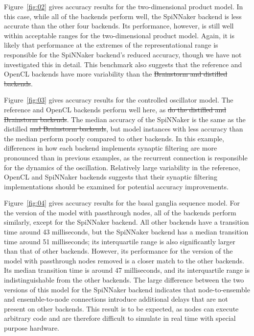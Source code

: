 \documentclass{frontiersSCNS}
\providecommand{\DIFadd}[1]{{\protect\color{blue}\uwave{#1}}} %
\providecommand{\DIFdel}[1]{{\protect\color{red}\sout{#1}}}                      %
\providecommand{\DIFaddbegin}{} %
\providecommand{\DIFaddend}{} %
\providecommand{\DIFdelbegin}{} %
\providecommand{\DIFdelend}{} %
\begin{document}
Figure~\ref{fig:02} gives accuracy results
for the two-dimensional product model.
In this case, while all of the backends
perform well, the SpiNNaker backend
is less accurate than the other four backends.
Its performance, however, is still well within
acceptable ranges for the two-dimensional product model.
Again, it is likely that performance at the extremes
of the representational range
is responsible for the SpiNNaker backend's
reduced accuracy,
though we have not investigated this in detail.
This benchmark also suggests that
the reference and OpenCL backends
have more variability than the \DIFdelbegin \DIFdel{Brainstorm and distilled backends}\DIFdelend \DIFaddbegin \DIFadd{distilled backend}\DIFaddend .

Figure~\ref{fig:03} gives accuracy results
for the controlled oscillator model.
The reference and OpenCL backends perform well here,
as \DIFdelbegin \DIFdel{do the distilled and Brainstorm backends}\DIFdelend \DIFaddbegin \DIFadd{does the distilled backend}\DIFaddend .
The median accuracy of the SpiNNaker is
the same as the distilled \DIFdelbegin \DIFdel{and Brainstorm backends}\DIFdelend \DIFaddbegin \DIFadd{backend}\DIFaddend ,
but model instances with less accuracy than the median
perform poorly compared to other backends.
In this example, differences in how each backend
implements synaptic filtering
are more pronounced than in previous examples,
as the recurrent connection is responsible
for the dynamics of the oscillation.
Relatively large variability in the
reference, OpenCL and SpiNNaker backends
suggests that their synaptic filtering implementations
should be examined for potential accuracy improvements.

Figure~\ref{fig:04} gives accuracy results
for the basal ganglia sequence model.
For the version of the model with passthrough nodes,
all of the backends perform similarly,
except for the SpiNNaker backend.
All other backends have a transition time
around 43 milliseconds,
but the SpiNNaker backend has a median transition time
around 51 milliseconds;
its interquartile range
is also significantly larger
than that of other backends.
However, its performance for
the version of the model
with passthrough nodes removed
is a closer match to the other backends.
Its median transition time
is around 47 milliseconds,
and its interquartile range
is indistinguishable from the other backends.
The large difference between the two versions
of this model for the SpiNNaker backend
indicates that node-to-ensemble and
ensemble-to-node connections
introduce additional delays that are
not present on other backends.
This result is to be expected,
as nodes can execute arbitrary code
and are therefore difficult
to simulate in real time
with special purpose hardware.
\end{document}
